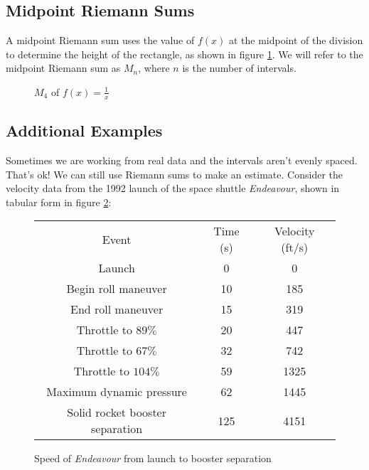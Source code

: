 \subsection{Midpoint Riemann Sums}
A midpoint Riemann sum uses the value of $f(x)$ at the midpoint of the division to determine the height of the rectangle, as shown in figure \ref{fig:midriemann}. We will refer to the midpoint Riemann sum as $M_n$, where $n$ is the number of intervals. 

\begin{figure}
    \centering
    \caption{$M_4$ of $f(x)=\frac{1}{x}$}
    \label{fig:midriemann}
\end{figure}

\subsection{Additional Examples}
Sometimes we are working from real data and the intervals aren't evenly spaced. That's ok! We can still use Riemann sums to make an estimate. Consider the velocity data from the 1992 launch of the space shuttle \textit{Endeavour}, shown in tabular form in figure \ref{fig:endeavourdata}:

\begin{figure}
	\centering
	\begin{tabular}{c|c|c}
	Event & Time (s) & Velocity (ft/s) \\
	Launch & 0 & 0 \\
	Begin roll maneuver & 10 & 185 \\
	End roll maneuver & 15 & 319 \\
	Throttle to $89\%$ & 20 & 447 \\
	Throttle to $67\%$ & 32 & 742 \\
	Throttle to $104\%$ & 59 & 1325 \\
	Maximum dynamic pressure & 62 & 1445 \\
	Solid rocket booster separation & 125 & 4151 \\
	\end{tabular}
	\caption{Speed of \textit{Endeavour} from launch to booster separation}
	\label{fig:endeavourdata}
\end{figure}

